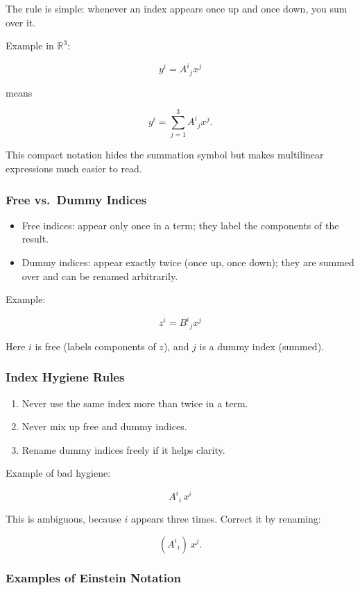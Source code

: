 \documentclass[
  letterpaper,
  DIV=11,
  numbers=noendperiod]{scrreprt}
\providecommand{\tightlist}{%
  \setlength{\itemsep}{0pt}\setlength{\parskip}{0pt}}
\begin{document}
The rule is simple: whenever an index appears once up and once down, you
sum over it.

Example in \(\mathbb{R}^3\):

\[
y^i = A^i{}_j x^j
\]

means

\[
y^i = \sum_{j=1}^3 A^i{}_j x^j.
\]

This compact notation hides the summation symbol but makes multilinear
expressions much easier to read.

\subsubsection{Free vs.~Dummy Indices}\label{free-vs.-dummy-indices}

\begin{itemize}
\tightlist
\item
  Free indices: appear only once in a term; they label the components of
  the result.
\item
  Dummy indices: appear exactly twice (once up, once down); they are
  summed over and can be renamed arbitrarily.
\end{itemize}

Example:

\[
z^i = B^i{}_j x^j
\]

Here \(i\) is free (labels components of \(z\)), and \(j\) is a dummy
index (summed).

\subsubsection{Index Hygiene Rules}\label{index-hygiene-rules}

\begin{enumerate}
\def\labelenumi{\arabic{enumi}.}
\tightlist
\item
  Never use the same index more than twice in a term.
\item
  Never mix up free and dummy indices.
\item
  Rename dummy indices freely if it helps clarity.
\end{enumerate}

Example of bad hygiene:

\[
A^i{}_i \, x^i
\]

This is ambiguous, because \(i\) appears three times. Correct it by
renaming:

\[
(A^i{}_i) \, x^j.
\]

\subsubsection{Examples of Einstein
Notation}\label{examples-of-einstein-notation}
\end{document}
